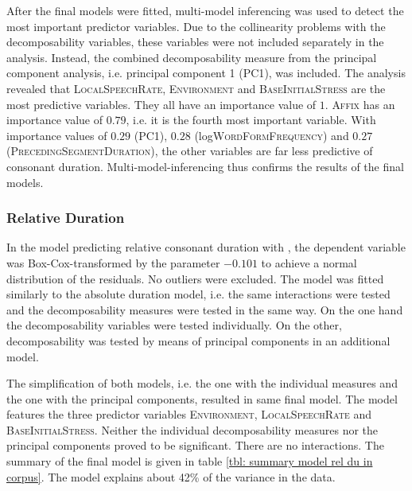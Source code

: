 After the final models were fitted, multi-model inferencing  was used to detect the most important predictor variables. Due to the collinearity problems with the decomposability variables, these variables were not included separately in the analysis. Instead, the combined decomposability measure from the principal component analysis, i.e. principal component 1 (\textsc{PC1}), was included.
The analysis revealed that \textsc{LocalSpeechRate}, \textsc{Environment} and \textsc{BaseInitialStress} are the most predictive variables. They all have an importance value of $1$. \textsc{Affix} has an importance value of $0.79$, i.e. it is the fourth most important variable. With importance values of $0.29$ (\textsc{PC1}), $0.28$ (log\textsc{WordFormFrequency}) and $0.27$ (\textsc{PrecedingSegmentDuration}), the other variables are far less predictive of consonant duration. Multi-model-inferencing thus confirms the results of the final models.


\subsubsection{Relative Duration}

In the model predicting relative consonant duration with , the dependent variable was Box-Cox-transformed by the parameter $-0.101$ to achieve a normal distribution of the residuals. No outliers were excluded. The model was fitted similarly to the absolute duration model, i.e. the same interactions were tested and the decomposability measures were tested in the same way. On the one hand the decomposability variables were tested individually. On the other, decomposability was tested by means of principal components in an additional model. 

The simplification of both models, i.e. the one with the individual measures and the one with the principal components, resulted in same final model. The model features the three predictor variables \textsc{Environment}, \textsc{LocalSpeechRate} and \textsc{BaseInitialStress}. Neither the individual decomposability measures nor the principal components proved to be significant. There are no interactions. 
The summary of the final model is given in table \ref{tbl: summary model rel du in corpus}. The model explains about 42\% of the variance in the data.\\





